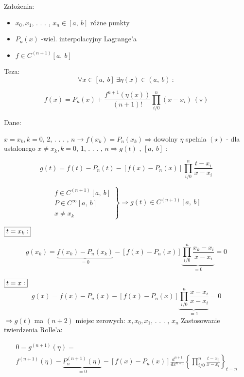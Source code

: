  
 
 \begin{frame}

Założenia:

\begin{itemize}
\item $x_{0}, x_{1}$, . . . , $x_{n}\in[a,\ b]$ różne punkty 
\item $P_{n}(x)$ -wiel. interpolacyjny Lagrange'a 
\item $f\in C^{(n+1)}[a,\ b]$
\end{itemize}

\begin{block}
{Teza:}
$$\forall x\in[a,\ b]\ \exists\eta(x)\in(a,\ b)\ :$$

$$f(x)=P_{n}(x)+\frac{f^{n+1}(\eta(x))}{(n+1)!}\prod_{i/0}^{n}(x-x_{i})\ (\star)$$
\end{block}

\end{frame}

\begin{frame}
Dane:

$x=x_{k}, k=0$, 2, . . . , $n \rightarrow f(x_{k})=P_{n}(x_{k})\Rightarrow$dowolny $\eta$ spelnia $(\star)$ \newline
- dla ustalonego $x\neq x_{k}, k=0$, 1, . . . , $n\Rightarrow g(t)$ , $[a,\ b]$ :

$$g(t)=f(t)-P_{n}(t)-[f(x)-P_{n}(x)]\prod_{i/0}^{n}\frac{t-x_{i}}{x-x_{i}}$$

$$
 \left. \begin{array}{ll}
f\in C^{(n+1)}[a,\ b] \\
P\in C^{\infty}[a,\ b]\\
x\neq x_{k}
\end{array} \right \} \Rightarrow g(t)\in C^{(n+1)}[a,\ b] 
$$

$\fbox{$t=x_{k}:$}$

$$g(x_{k})=\underbrace{f(x_{k})-P_{n}(x_{k})}_{=0}-[f(x)-P_{n}(x)]\underbrace{\prod_{i/0}^{n}\frac{x_{k}-x_{i}}{x-x_{i}}}_{=0}=0$$

\end{frame}

\begin{frame}
$\fbox{$t=x:$}$
$$
g(x)=f(x)-P_{n}(x)-[f(x)-P_{n}(x)]\underbrace{\prod_{i/0}^{n}\frac{x-x_{i}}{x-x_{i}}}_{=1}=0
$$
$\Rightarrow g(t)$ ma $(n+2)$ miejsc zerowych: $x, x_{0}, x_{1}$, . . . , $x_{n}$ \newline \newline
Zastosowanie twierdzenia Rolle'a:


$$\begin{array}{ll}
0=g^{(n+1)}(\displaystyle \eta)= \\
f^{(n+1)}(\eta)-\underbrace{P_{n}^{(n+1)}(\eta)}_{=0}-[f(x)-P_{n}(x)]\frac{d^{n+1}}{dx^{n+1}} \left \{\prod_{i/0}^{n}\frac{t-x_{i}}{x-x_{i}} \right \}_{t=\eta}  \end{array}$$


 \end{frame}
 

